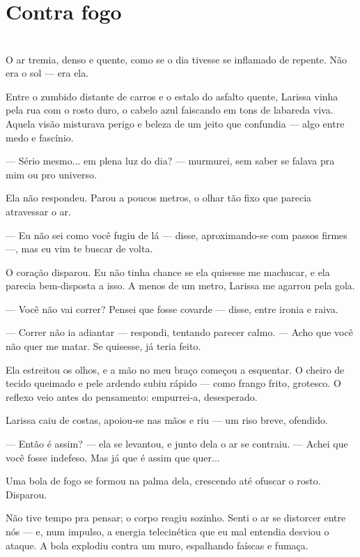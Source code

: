 \newpage

\ifdefined\useChapters
\chapter{Contra fogo}
\else
\chapter{}
\fi

O ar tremia, denso e quente, como se o dia tivesse se inflamado de repente.  
Não era o sol — era ela.

Entre o zumbido distante de carros e o estalo do asfalto quente, Larissa vinha pela rua com o rosto duro, o cabelo azul faiscando em tons de labareda viva.  
Aquela visão misturava perigo e beleza de um jeito que confundia — algo entre medo e fascínio.

— Sério mesmo... em plena luz do dia? — murmurei, sem saber se falava pra mim ou pro universo.

Ela não respondeu.  
Parou a poucos metros, o olhar tão fixo que parecia atravessar o ar.

— Eu não sei como você fugiu de lá — disse, aproximando-se com passos firmes —, mas eu vim te buscar de volta.

O coração disparou.  
Eu não tinha chance se ela quisesse me machucar, e ela parecia bem-disposta a isso.  
A menos de um metro, Larissa me agarrou pela gola.

— Você não vai correr? Pensei que fosse covarde — disse, entre ironia e raiva.

— Correr não ia adiantar — respondi, tentando parecer calmo. — Acho que você não quer me matar. Se quisesse, já teria feito.

Ela estreitou os olhos, e a mão no meu braço começou a esquentar.  
O cheiro de tecido queimado e pele ardendo subiu rápido — como frango frito, grotesco.  
O reflexo veio antes do pensamento: empurrei-a, desesperado.

Larissa caiu de costas, apoiou-se nas mãos e riu — um riso breve, ofendido.

— Então é assim? — ela se levantou, e junto dela o ar se contraiu. — Achei que você fosse indefeso.  
Mas já que é assim que quer...

Uma bola de fogo se formou na palma dela, crescendo até ofuscar o rosto.  
Disparou.

Não tive tempo pra pensar; o corpo reagiu sozinho.  
Senti o ar se distorcer entre nós — e, num impulso, a energia telecinética que eu mal entendia desviou o ataque.  
A bola explodiu contra um muro, espalhando faíscas e fumaça.

